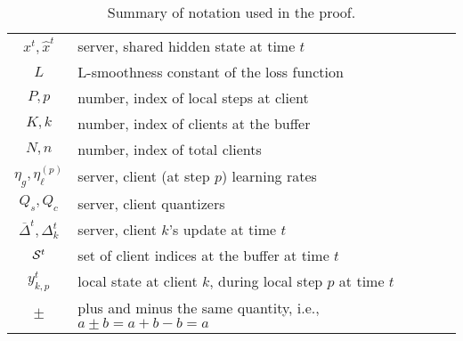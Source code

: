 \begin{table}[ht]
    \caption{Summary of notation used in the proof.}
    \label{tab:notation-summary}
    \begin{center}
        \begin{tabular}{@{}cl@{}}
            \toprule
            $x^t, \hat x^t$                   & server, shared hidden state at time $t$                           \\
            $L$                               & L-smoothness constant of the loss function                        \\
            $P, p$                            & number, index of local steps at client                            \\
            $K, k$                            & number, index of clients at the buffer                            \\
            $N, n$                            & number, index of total clients                                    \\
            $\eta_g, \eta_\ell^{(p)}$         & server, client (at step $p$) learning rates                       \\
            $Q_s, Q_c$                        & server, client quantizers                                         \\
            $\overline{\Delta}^t, \Delta_k^t$ & server, client $k$'s update at time $t$                           \\
            $\mathcal{S}^t$                         & set of client indices at the buffer at time $t$                   \\
            $y_{k,p}^t$                       & local state at client $k$, during local step $p$ at time $t$      \\
            $\pm$                             & plus and minus the same quantity, i.e., $a \pm b = a + b - b = a$ \\
            \bottomrule
        \end{tabular}
    \end{center}
\end{table}

